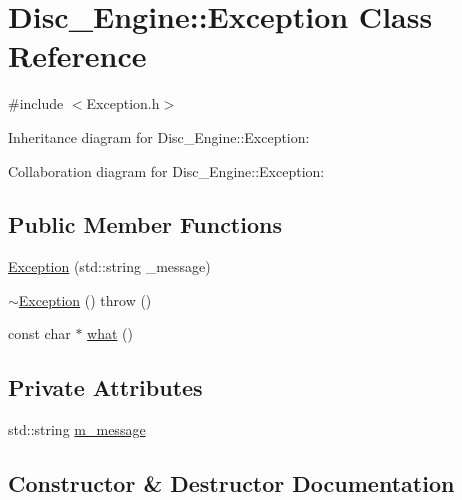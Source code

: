 \hypertarget{class_disc___engine_1_1_exception}{}\section{Disc\+\_\+\+Engine\+:\+:Exception Class Reference}
\label{class_disc___engine_1_1_exception}


{\ttfamily \#include $<$Exception.\+h$>$}



Inheritance diagram for Disc\+\_\+\+Engine\+:\+:Exception\+:


Collaboration diagram for Disc\+\_\+\+Engine\+:\+:Exception\+:
\subsection*{Public Member Functions}
\begin{DoxyCompactItemize}
\item 
\mbox{\hyperlink{class_disc___engine_1_1_exception_ad17bdcd9d14fcb0fa63a2a78c8e8ce7f}{Exception}} (std\+::string \+\_\+message)
\item 
\mbox{\hyperlink{class_disc___engine_1_1_exception_a6b214cd8627d0968bdeebc1fbb9556b8}{$\sim$\+Exception}} ()  throw ()
\item 
const char $\ast$ \mbox{\hyperlink{class_disc___engine_1_1_exception_a13c431600678afff2c9bd596ec97d2ee}{what}} ()
\end{DoxyCompactItemize}
\subsection*{Private Attributes}
\begin{DoxyCompactItemize}
\item 
std\+::string \mbox{\hyperlink{class_disc___engine_1_1_exception_ab78890e1a386ea2813eebeebdaf910ef}{m\+\_\+message}}
\end{DoxyCompactItemize}


\subsection{Constructor \& Destructor Documentation}
\mbox{\label{class_disc___engine_1_1_exception_ad17bdcd9d14fcb0fa63a2a78c8e8ce7f}} 
